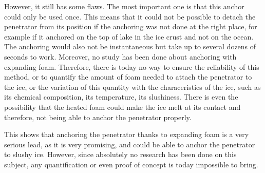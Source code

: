 However, it still has some flaws. The most important one is that this anchor could only be used once. This means that it could not be possible to detach the penetrator from its position if the anchoring was not done at the right place, for example if it anchored on the top of lake in the ice crust and not on the ocean. The anchoring would also not be instantaneous but take up to several dozens of seconds to work.
Moreover, no study has been done about anchoring with expanding foam. Therefore, there is today no way to ensure the reliability of this method, or to quantify the amount of foam needed to attach the penetrator to the ice, or the variation of this quantity with the characeristics of the ice, such as its chemical composition, its temperature, its slushiness. There is even the possibility that the heated foam could make the ice melt at its contact and therefore, not being able to anchor the penetrator properly.

This shows that anchoring the penetrator thanks to expanding foam is a very serious lead, as it is very promising, and could be able to anchor the penetrator to slushy ice. However, since absolutely no research has been done on this subject, any quantification or even proof of concept is today impossible to bring.



